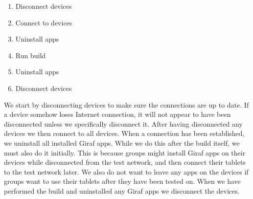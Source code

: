 \begin{enumerate}
  \item Disconnect devices
  \item Connect to devices
  \item Uninstall apps
  \item Run build
  \item Uninstall apps
  \item Disconnect devices
\end{enumerate}

We start by disconnecting devices to make sure the connections are up to date. If a device somehow loses Internet connection, it will not appear to have been disconnected unless we specifically disconnect it. After having disconnected any devices we then connect to all devices. When a connection has been established, we uninstall all installed Giraf apps. While we do this after the build itself, we must also do it initially. This is because groups might install Giraf apps on their devices while disconnected from the test network, and then connect their tablets to the test network later. We also do not want to leave any apps on the devices if groups want to use their tablets after they have been tested on. When we have performed the build and uninstalled any Giraf apps we disconnect the devices.